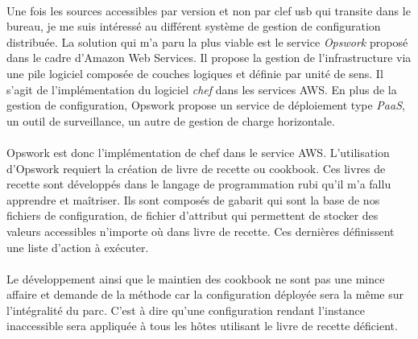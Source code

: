 \documentclass[11pt, a4paper ]{article}
\begin{document}
\begin{spacing}{1.5}
\paragraph{}
Une fois les sources accessibles par version et non par clef usb qui transite dans le bureau, je me suis intéressé au différent système de gestion de configuration distribuée. La solution qui m'a paru la plus viable est le service \emph{Opswork} proposé dans le cadre d'Amazon Web Services. Il propose la gestion de l'infrastructure via une pile logiciel composée de couches logiques et définie par unité de sens. Il s'agit de l'implémentation du logiciel \emph{chef} dans les services AWS. En plus de la gestion de configuration, Opswork propose un service de déploiement type \emph{PaaS}, un outil de surveillance, un autre de gestion de charge horizontale.
\paragraph{}
Opswork est donc l'implémentation de chef dans le service AWS. L'utilisation d'Opswork requiert la création de livre de recette ou cookbook. Ces livres de recette sont développés dans le langage de programmation rubi qu'il m'a fallu apprendre et maîtriser. Ils sont composés de gabarit qui sont la base de nos fichiers de configuration, de fichier d’attribut qui permettent de stocker des valeurs accessibles n'importe où dans livre de recette. Ces dernières définissent une liste d'action à exécuter.
\paragraph{}
Le développement ainsi que le maintien des cookbook ne sont pas une mince affaire et demande de la méthode car la configuration déployée sera la même sur l'intégralité du parc. C'est à dire qu'une configuration rendant l'instance inaccessible sera appliquée à tous les hôtes utilisant le livre de recette déficient.

\end{spacing}
\end{document}
